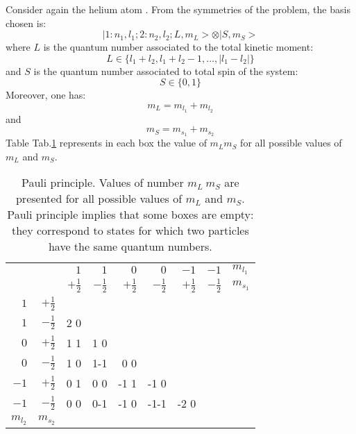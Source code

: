 \documentclass[12pt]{book}
\begin{document}
\begin{exmp}
Consider again the helium atom \cite{ph:mecaq:Cohen73}. From the symmetries of
the problem, the basis chosen is:
\begin{equation}
|1:n_1,l_1;2:n_2,l_2;L,m_L>\otimes|S,m_S>
\end{equation}
where $L$ is the quantum number associated to the total kinetic
moment: 
\begin{equation}
L\in\{l_1+l_2,l_1+l_2-1, \dots,|l_1-l_2|\}
\end{equation}
and $S$ is the quantum number associated to total spin of the
system:
\begin{equation}
S\in\{0,1\}
\end{equation}
Moreover, one has:
\begin{equation}
m_L=m_{l_1}+m_{l_2}
\end{equation}
and
\begin{equation}
m_S=m_{s_1}+m_{s_2}
\end{equation}
Table Tab.\ref{tabpauli} represents in each box the value of $m_Lm_S$ for all
possible values of $m_L$ and $m_S$.
\begin{table}[hbt]\label{tabpauli}
\caption{Pauli principle. Values of number $m_L\:m_S$ are presented for all
  possible values of $m_L$ and $m_S$. Pauli principle implies that some boxes
  are empty: they correspond to states for which two particles have the same
  quantum numbers.}
\begin{center}
\begin{tabular}{|r|r|r|r|r|r|r|r|l|}
\cline{3-9}
\multicolumn{1}{c}{}& &$1$&$1$&$0$&$0$&$-1$&$-1$&$m_{l_1}$\\
\multicolumn{1}{c}{}& &$+\frac{1}{2}$&$-\frac{1}{2}$&$+\frac{1}{2}$&$-\frac{1}{2}$&$+\frac{1}{2}$&$-\frac{1}{2}$&$m_{s_1}$\\
\hline
$1$&$+\frac{1}{2}$&&&&&&&\multicolumn{1}{c}{}\\
\cline{1-8}
$1$&$-\frac{1}{2}$& 2  0&&&&&&\multicolumn{1}{c}{}\\
\cline{1-8}
$0$&$+\frac{1}{2}$& 1  1& 1  0&&&&&\multicolumn{1}{c}{}\\
\cline{1-8}
$0$&$-\frac{1}{2}$& 1  0& 1-1& 0  0&&&&\multicolumn{1}{c}{}\\
\cline{1-8}
$-1$&$+\frac{1}{2}$& 0  1& 0  0 &-1  1&-1  0&&&\multicolumn{1}{c}{}\\
\cline{1-8}
$-1$&$-\frac{1}{2}$& 0  0& 0-1&-1  0&-1-1&-2  0&&\multicolumn{1}{c}{}\\
\cline{1-8}
$m_{l_2}$&$m_{s_2}$&\multicolumn{7}{c}{}\\

\end{tabular}
\end{center}
\end{table}
\end{exmp}
\end{document}
